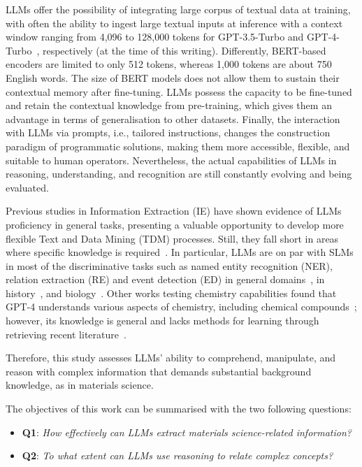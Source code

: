 LLMs offer the possibility of integrating large corpus of textual data at training, with often the ability to ingest large textual inputs at inference with a context window ranging from 4,096 to 128,000 tokens for GPT-3.5-Turbo and GPT-4-Turbo~\cite{OpenAIDocJan2024}, respectively (at the time of this writing). 
Differently, BERT-based encoders are limited to only 512 tokens, whereas 1,000 tokens are about 750 English words. 
The size of BERT models does not allow them to sustain their contextual memory after fine-tuning. LLMs possess the capacity to be fine-tuned and retain the contextual knowledge from pre-training, which gives them an advantage in terms of generalisation to other datasets.
Finally, the interaction with LLMs via prompts, i.e., tailored instructions, changes the construction paradigm of programmatic solutions, making them more accessible, flexible, and suitable to human operators. Nevertheless, the actual capabilities of LLMs in reasoning, understanding, and recognition are still constantly evolving and being evaluated. 

Previous studies in Information Extraction (IE) have shown evidence of LLMs proficiency in general tasks, presenting a valuable opportunity to develop more flexible Text and Data Mining (TDM) processes. Still, they fall short in areas where specific knowledge is required~\cite{kokon2023chatgpt}. In particular, LLMs are on par with SLMs in most of the discriminative tasks such as named entity recognition (NER), relation extraction (RE) and event detection (ED) in general domains~\cite{ma2023large}, in history~\cite{gonzalez2023yes}, and biology~\cite{moradi2021gpt}. 
Other works testing chemistry capabilities found that GPT-4 understands various aspects of chemistry, including chemical compounds~\cite{hatakeyama2023prompt}; however, its knowledge is general and lacks methods for learning through retrieving recent literature~\cite{hatakeyama2023using}.

Therefore, this study assesses LLMs' ability to comprehend, manipulate, and reason with complex information that demands substantial background knowledge, as in materials science. 

The objectives of this work can be summarised with the two following questions: 
\begin{itemize}
    \item \textbf{Q1}: \textit{How effectively can LLMs extract materials science-related information?}
    \item \textbf{Q2}: \textit{To what extent can LLMs use reasoning to relate complex concepts?}
\end{itemize}

